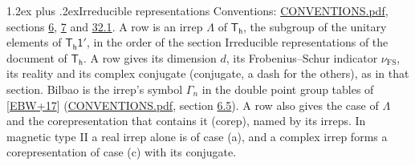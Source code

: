 \documentclass[10pt,a4paper]{article}
\makeatletter
\renewcommand\section{\@startsection{section}{1}{\z@}{-3ex plus -1ex minus -.2ex}%
  {1.2ex plus .2ex}{\normalfont\large\sffamily\bfseries\color{parttitle}}}
\numberwithin{equation}{section}
\newcommand{\grp}[1]{\mathsf{#1}}
\newcommand{\fsind}{\nu_{\mathrm{FS}}}
\makeatother
\begin{document}
\section{Irreducible representations}\label{s:irreps}
Conventions: \href{../../CONVENTIONS.pdf}{CONVENTIONS.pdf}, sections \href{../../../rotation/CONVENTIONS.pdf\#conv.6}{6}, \href{../../../rotation/CONVENTIONS.pdf\#conv.7}{7} and \href{../../CONVENTIONS.pdf\#conv.32.1}{32.1}.
\leavevmode\label{n:irrep.Delta}A row is an irrep $\Lambda$ of $\grp{T_{h}}$, the subgroup of the unitary elements of $\grp{T_{h}1'}$, in the order of the section Irreducible representations of the document of \href{../../../rotation/data/pdf/Th.pdf}{$\grp{T_{h}}$}. \label{n:index.dimension}\label{n:index.frobenius}\label{n:head.irrep}\label{n:head.reality}\label{n:head.conjugate}A row gives its dimension $d$, its Frobenius--Schur indicator $\fsind$, its reality and its complex conjugate (conjugate, a dash for the others), as in that section. \label{n:head.bilbao}\label{n:irrep.alias.gamma}Bilbao is the irrep's symbol $\Gamma_n$ in the double point group tables of [\href{../../../REFERENCES.pdf\#ref.EBW+17}{EBW+17}] (\href{../../CONVENTIONS.pdf}{CONVENTIONS.pdf}, section \href{../../../rotation/CONVENTIONS.pdf\#conv.6.5}{6.5}). \label{n:head.case.corep}\label{n:head.corep}A row also gives the case of $\Lambda$ and the corepresentation that contains it (corep), named by its irreps. In magnetic type II a real irrep alone is of case (a), and a complex irrep forms a corepresentation of case (c) with its conjugate.
\setlength{\emergencystretch}{2em}\par\setlength{\emergencystretch}{0pt}
\end{document}
